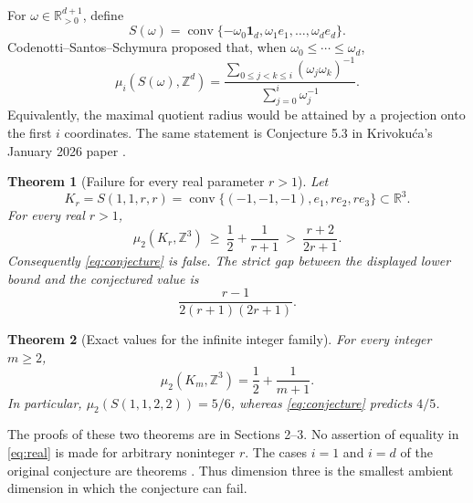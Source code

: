 \documentclass[11pt,a4paper]{article}
\newtheorem{theorem}{Theorem}[section]
\theoremstyle{remark}
\DeclareMathOperator{\conv}{conv}
\newcommand{\R}{\mathbb R}\newcommand{\Z}{\mathbb Z}
\newcommand{\one}{\mathbf1}
\begin{document}
For $\omega\in\R_{>0}^{d+1}$, define
\[
 S(\omega)=\conv\{-\omega_0\one_d,\omega_1e_1,\ldots,\omega_de_d\}.
\]
Codenotti--Santos--Schymura \cite[Conjecture 5.3]{CSS} proposed that,
when $\omega_0\le\cdots\le\omega_d$,
\begin{equation}\label{eq:conjecture}
 \mu_i(S(\omega),\Z^d)=
 \frac{\displaystyle\sum_{0\le j<k\le i}(\omega_j\omega_k)^{-1}}
      {\displaystyle\sum_{j=0}^{i}\omega_j^{-1}}.
\end{equation}
Equivalently, the maximal quotient radius would be attained by a
projection onto the first $i$ coordinates. The same statement is
Conjecture 5.3 in Krivoku\'ca's January 2026 paper \cite{Krivokuca}.

\begin{theorem}[Failure for every real parameter $r>1$]\label{thm:real}
Let
\[
 K_r=S(1,1,r,r)=\conv\{(-1,-1,-1),e_1,re_2,re_3\}\subset\R^3.
\]
For every real $r>1$,
\begin{equation}\label{eq:real}
 \mu_2(K_r,\Z^3)\ \ge\ \frac12+\frac1{r+1}
 \ >\ \frac{r+2}{2r+1}.
\end{equation}
Consequently \eqref{eq:conjecture} is false. The strict gap between the
displayed lower bound and the conjectured value is
\begin{equation}\label{eq:gap}
 \frac{r-1}{2(r+1)(2r+1)}.
\end{equation}
\end{theorem}

\begin{theorem}[Exact values for the infinite integer family]\label{thm:integer}
For every integer $m\ge2$,
\begin{equation}\label{eq:integer}
 \boxed{\mu_2(K_m,\Z^3)=\frac12+\frac1{m+1}.}
\end{equation}
In particular, $\mu_2(S(1,1,2,2))=5/6$, whereas
\eqref{eq:conjecture} predicts $4/5$.
\end{theorem}

The proofs of these two theorems are in Sections 2--3. No assertion
of equality in \eqref{eq:real} is made for arbitrary noninteger $r$.
The cases $i=1$ and $i=d$ of the original conjecture are theorems
\cite[Theorem 1.4 and the discussion after Conjecture 5.3]{CSS}.
Thus dimension three is the smallest ambient dimension in which
the conjecture can fail.
\end{document}

